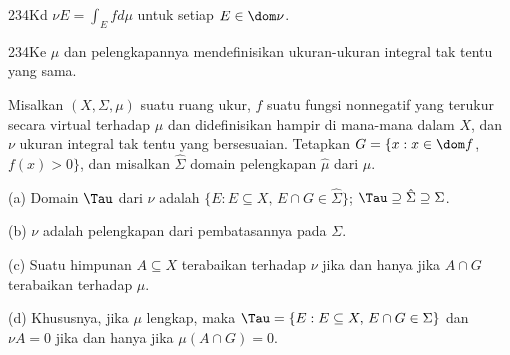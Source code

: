 \spheader 234Kd $\nu E=\int_Efd\mu$ untuk setiap
$E\in\dom\nu$.

\spheader 234Ke
$\mu$ dan pelengkapannya mendefinisikan
 ukuran-ukuran
integral tak tentu yang sama.

 Misalkan $(X,\Sigma,\mu)$ suatu ruang ukur,
$f$ suatu fungsi nonnegatif yang terukur secara virtual terhadap $\mu$
dan didefinisikan hampir di mana-mana dalam $X$, dan $\nu$ ukuran
integral tak tentu yang bersesuaian. Tetapkan
$G=\{x:x\in\dom f$, $f(x)>0\}$, dan misalkan $\hat\Sigma$ domain
pelengkapan $\hat\mu$ dari $\mu$.

(a) Domain $\Tau$ dari $\nu$ adalah
$\{E:E\subseteq X,\,E\cap G\in\hat\Sigma\}$; 
$\Tau\supseteq\hat\Sigma\supseteq\Sigma$.

(b) $\nu$ adalah pelengkapan dari pembatasannya pada $\Sigma$.

(c) Suatu himpunan $A\subseteq X$ terabaikan terhadap $\nu$ jika dan
hanya jika $A\cap G$ terabaikan terhadap $\mu$.

(d) Khususnya, jika $\mu$ lengkap, maka
$\Tau=\{E:E\subseteq X,\,E\cap G\in\Sigma\}$ dan $\nu A=0$ jika dan
hanya jika $\mu(A\cap G)=0$.


